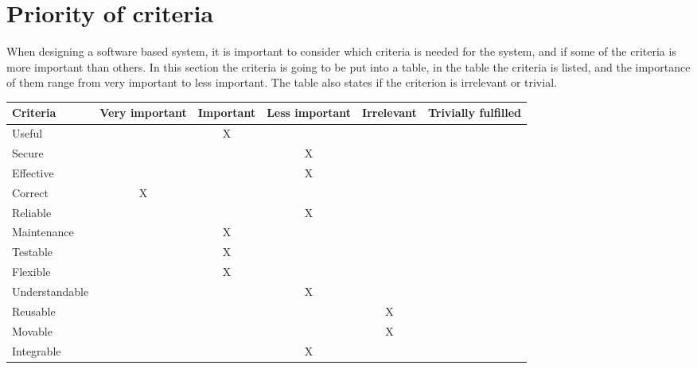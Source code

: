 \section{Priority of criteria}

When designing a software based system, it is important to consider which criteria is needed for the system, and if some of the criteria is more important than others. In this section the criteria is going to be put into a table, in the table the criteria is listed, and the importance of them range from very important to less important. The table also states if the criterion is irrelevant or trivial.

\begin{table}[h]
\begin{tabular}{|l|c|c|c|c|c|}\hline
Criteria        & Very important & Important & Less important & Irrelevant & Trivially fulfilled \\\hline
Useful          &                & X         &                &            &                     \\\hline
Secure          &                &           & X              &            &                     \\\hline
Effective       &                &           & X              &            &                     \\\hline
Correct         & X              &           &                &            &                     \\\hline
Reliable        &                &           & X              &            &                     \\\hline
Maintenance     &                & X         &                &            &                     \\\hline
Testable        &                & X         &                &            &                     \\\hline
Flexible        &                & X         &                &            &                     \\\hline
Understandable  &                &           & X              &            &                     \\\hline
Reusable        &                &           &                & X          &                     \\\hline
Movable         &                &           &                & X          &                     \\\hline
Integrable      &                &           & X              &            &                     \\\hline
\end{tabular}
\end{table}

